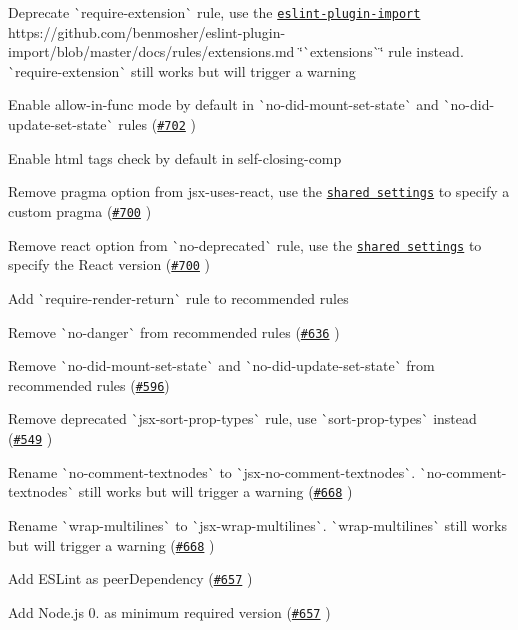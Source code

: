 \begin{DoxyItemize}
\item Deprecate \`{}require-\/extension\`{} rule, use the \href{https://github.com/benmosher/eslint-plugin-import}{\tt eslint-\/plugin-\/import} https\+://github.com/benmosher/eslint-\/plugin-\/import/blob/master/docs/rules/extensions.\+md \char`\"{}\`{}extensions\`{}\char`\"{} rule instead. \`{}require-\/extension\`{} still works but will trigger a warning
\item Enable {\ttfamily allow-\/in-\/func} mode by default in \`{}no-\/did-\/mount-\/set-\/state\`{} and \`{}no-\/did-\/update-\/set-\/state\`{} rules (\href{https://github.com/yannickcr/eslint-plugin-react/pull/702}{\tt \#702} )
\item Enable html tags check by default in {\ttfamily self-\/closing-\/comp}
\item Remove {\ttfamily pragma} option from {\ttfamily jsx-\/uses-\/react}, use the \href{README.md#configuration}{\tt shared settings} to specify a custom pragma (\href{https://github.com/yannickcr/eslint-plugin-react/pull/700}{\tt \#700} )
\item Remove {\ttfamily react} option from \`{}no-\/deprecated\`{} rule, use the \href{README.md#configuration}{\tt shared settings} to specify the React version (\href{https://github.com/yannickcr/eslint-plugin-react/pull/700}{\tt \#700} )
\item Add \`{}require-\/render-\/return\`{} rule to recommended rules
\item Remove \`{}no-\/danger\`{} from recommended rules (\href{https://github.com/yannickcr/eslint-plugin-react/pull/636}{\tt \#636} )
\item Remove \`{}no-\/did-\/mount-\/set-\/state\`{} and \`{}no-\/did-\/update-\/set-\/state\`{} from recommended rules (\href{https://github.com/yannickcr/eslint-plugin-react/issues/596}{\tt \#596})
\item Remove deprecated \`{}jsx-\/sort-\/prop-\/types\`{} rule, use \`{}sort-\/prop-\/types\`{} instead (\href{https://github.com/yannickcr/eslint-plugin-react/issues/549}{\tt \#549} )
\item Rename \`{}no-\/comment-\/textnodes\`{} to \`{}jsx-\/no-\/comment-\/textnodes\`{}. \`{}no-\/comment-\/textnodes\`{} still works but will trigger a warning (\href{https://github.com/yannickcr/eslint-plugin-react/issues/668}{\tt \#668} )
\item Rename \`{}wrap-\/multilines\`{} to \`{}jsx-\/wrap-\/multilines\`{}. \`{}wrap-\/multilines\`{} still works but will trigger a warning (\href{https://github.com/yannickcr/eslint-plugin-react/issues/668}{\tt \#668} )
\item Add E\+S\+Lint as peer\+Dependency (\href{https://github.com/yannickcr/eslint-plugin-react/pull/657}{\tt \#657} )
\item Add Node.\+js 0. as minimum required version (\href{https://github.com/yannickcr/eslint-plugin-react/pull/657}{\tt \#657} )
\end{DoxyItemize}

